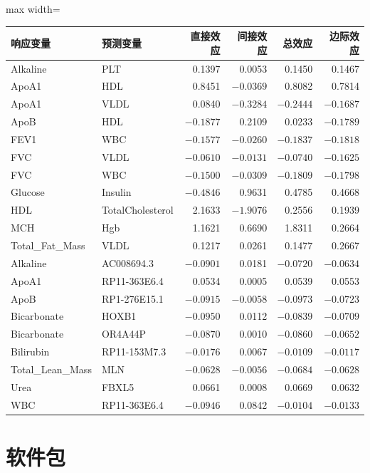 \begin{table}[htbp]
\centering
{}
\begin{adjustbox}{max width=\linewidth}
\small
\begin{tabular}{llrrrr}
\toprule
响应变量&预测变量&直接效应&间接效应&总效应&边际效应\\\midrule
Alkaline&PLT&0.1397&0.0053&0.1450&0.1467\\
ApoA1&HDL&0.8451&$-0.0369$&0.8082&0.7814\\
ApoA1&VLDL&0.0840&$-0.3284$&$-0.2444$&$-0.1687$\\
ApoB&HDL&$-0.1877$&0.2109&0.0233&$-0.1789$\\
FEV1&WBC&$-0.1577$&$-0.0260$&$-0.1837$&$-0.1818$\\
FVC&VLDL&$-0.0610$&$-0.0131$&$-0.0740$&$-0.1625$\\
FVC&WBC&$-0.1500$&$-0.0309$&$-0.1809$&$-0.1798$\\
Glucose&Insulin&$-0.4846$&0.9631&0.4785&0.4668\\
HDL&TotalCholesterol&2.1633&$-1.9076$&0.2556&0.1939\\
MCH&Hgb&1.1621&0.6690&1.8311&0.2664\\
Total\_Fat\_Mass&VLDL&0.1217&0.0261&0.1477&0.2667\\
Alkaline&AC008694.3&$-0.0901$&0.0181&$-0.0720$&$-0.0634$\\
ApoA1&RP11-363E6.4&0.0534&0.0005&0.0539&0.0553\\
ApoB&RP1-276E15.1&$-0.0915$&$-0.0058$&$-0.0973$&$-0.0723$\\
Bicarbonate&HOXB1&$-0.0950$&0.0112&$-0.0839$&$-0.0709$\\
Bicarbonate&OR4A44P&$-0.0870$&0.0010&$-0.0860$&$-0.0652$\\
Bilirubin&RP11-153M7.3&$-0.0176$&0.0067&$-0.0109$&$-0.0117$\\
Total\_Lean\_Mass&MLN&$-0.0628$&$-0.0056$&$-0.0684$&$-0.0628$\\
Urea&FBXL5&0.0661&0.0008&0.0669&0.0632\\
WBC&RP11-363E6.4&$-0.0946$&0.0842&$-0.0104$&$-0.0133$\\
\bottomrule
\end{tabular}
\end{adjustbox}
\end{table}
\FloatBarrier

\section*{软件包}

